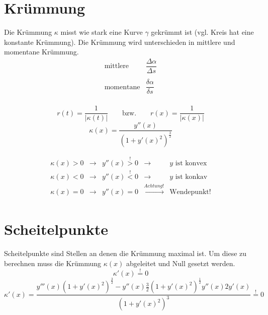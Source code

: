 
\section{Krümmung}

Die Krümmung $\kappa$ misst wie stark eine Kurve $\gamma$ gekrümmt ist (vgl. Kreis hat eine konstante Krümmung).
Die Krümmung wird unterschieden in mittlere und momentane Krümmung.
\[ \begin{array}{ll}
	\text{mittlere}  & \dfrac{\Delta \alpha}{\Delta s} \\
	& \\
	\text{momentane} & \dfrac{\delta \alpha}{\delta s} \\
\end{array} \]

\[ \boxed{r(t) = \dfrac{1}{|\kappa(t)|} \quad \quad \text{bzw.} \quad \quad r(x) = \dfrac{1}{|\kappa(x)|} } \]
\[ \boxed{\kappa(x) = \frac{y''(x)}{(1 + y'(x)^2)^{\frac{3}{2}}} }\]

\[\boxed{\begin{array}{lllll} 
	\kappa (x) > 0 & \rightarrow & y''(x) \stackrel{!}{>} 0 & \rightarrow & y \text{ ist konvex} \\
	\kappa (x) < 0 & \rightarrow & y''(x) \stackrel{!}{<} 0 & \rightarrow & y \text{ ist konkav} \\
	\kappa (x) = 0 & \rightarrow & y''(x) = 0		& \xrightarrow[]{Achtung!} & \text{Wendepunkt!}
\end{array}}\]
\section{Scheitelpunkte}
Scheitelpunkte sind Stellen an denen die Krümmung maximal ist. 
Um diese zu berechnen muss die Krümmung $\kappa (x)$ abgeleitet und Null gesetzt werden.
\[ \kappa '(x) \stackrel{!}{=} 0  \]
\[ \boxed{\kappa '(x) = \dfrac{ y'''(x)(1+y'(x)^2)^{\frac{3}{2}} - y''(x) \frac{3}{2}(1+y'(x)^2)^{\frac{1}{2}} y''(x) 2y'(x) }{ (1+y'(x)^2)^3 } \stackrel{!}{=} 0 } \]
